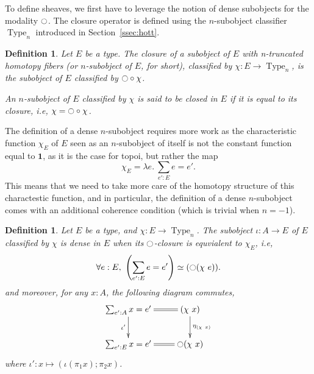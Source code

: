 \documentclass[conference]{IEEEtran}
\newtheorem{defi}[thm]{Definition}
\newcommand{\ie}{i.e,\xspace}
\DeclareMathOperator{\Type}{Type}
\DeclareMathOperator{\HProp}{HProp}
\newcommand{\modal}{\ensuremath{\ocircle}}
\newcommand \one {\mathbf{1}}
\begin{document}


To define sheaves, we first have to leverage the notion of dense
subobjects for the modality $\modal$. The closure operator is defined
using the $n$-subobject classifier $\Type_n$ introduced in
Section~\ref{ssec:hott}.

\begin{defi}
  Let $E$ be a type. The {\em closure} of a subobject of $E$ with
  n-truncated homotopy fibers (or $n$-subobject of $E$, for short),
  classified by $\chi : E \to \Type_n$, is the subobject of $E$
  classified by $\modal \circ \chi$.

  An $n$-subobject of $E$ classified by $\chi$ is said to be {\em
    closed in $E$} if it is equal to its closure, \ie
  $\chi = \modal \circ \chi$.
\end{defi}

The definition of a dense $n$-subobject requires more work as the
characteristic function $\chi_E$ of $E$ seen as an $n$-subobject of
itself is not the constant function equal to $\one$, as it is the case
for topoi, but rather the map 
%
$$\chi_E  = \lambda e . \ \sum_{e':E} e=e'.$$
%
This means that we need to take more care of the homotopy structure of
this charactestic function, and in particular, the definition of a
dense $n$-subobject comes with an additional coherence condition
(which is trivial when $n=-1$).

\begin{defi}
  Let $E$ be a type, and $\chi:E \to \Type_n$. The subobject $\iota :
  A \to E$ of $E$
  classified by $\chi$ is {\em dense} in $E$ when its $\modal$-closure
  is equvialent to $\chi_E$, \ie
  $$\forall e:E,~ \left(\sum_{e':E} e=e'\right) \simeq (\modal
  (\chi~e)).$$
  and moreover, for any $x:A$, the following diagram 
  commutes, 
  $$\xymatrix{
    \sum_{e':A} x = e' \ar@{=}[r] \ar[d]_{\iota'} & (\chi~x) \ar[d]^{\eta_{(\chi~x)}}\\
    \sum_{e':E} x = e' \ar@{=}[r] & \modal (\chi~x)
  }$$
  where $\iota': x \mapsto (\iota (\pi_1 x) ; \pi_2 x)$.
\end{defi}
\end{document}
